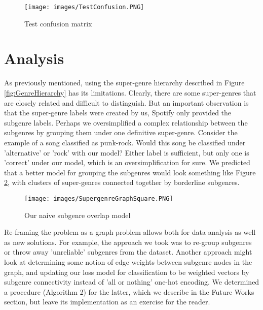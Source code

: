 \documentclass[conference]{IEEEtran}
\begin{document}
\begin{figure}[htbp]
\centerline{\texttt{[image: images/TestConfusion.PNG]}}
\caption{Test confusion matrix}
\label{fig:TestConfusion}
\end{figure}

\section{Analysis}
As previously mentioned, using the super-genre hierarchy described in Figure \ref{fig:GenreHierarchy} has its limitations. Clearly, there are some super-genres that are closely related and difficult to distinguish. But an important observation is that the super-genre labels were created by us, Spotify only provided the subgenre labels. Perhaps we oversimplified a complex relationship between the subgenres by grouping them under one definitive super-genre. Consider the example of a song classified as punk-rock. Would this song be classified under 'alternative' or 'rock' with our model? Either label is sufficient, but only one is 'correct' under our model, which is an oversimplification for sure. We predicted that a better model for grouping the subgenres would look something like Figure \ref{fig:NaiveOverlap}, with clusters of super-genres connected together by borderline subgenres.

\begin{figure}[htbp]
\centerline{\texttt{[image: images/SupergenreGraphSquare.PNG]}}
\caption{Our naive subgenre overlap model}
\label{fig:NaiveOverlap}
\end{figure}

Re-framing the problem as a graph problem allows both for data analysis as well as new solutions. For example, the approach we took was to re-group subgenres or throw away 'unreliable' subgenres from the dataset. Another approach might look at determining some notion of edge weights between subgenre nodes in the graph, and updating our loss model for classification to be weighted vectors by subgenre connectivity instead of 'all or nothing' one-hot encoding. We determined a procedure (Algorithm 2) for the latter, which we describe in the Future Works section, but leave its implementation as an exercise for the reader.
\end{document}
